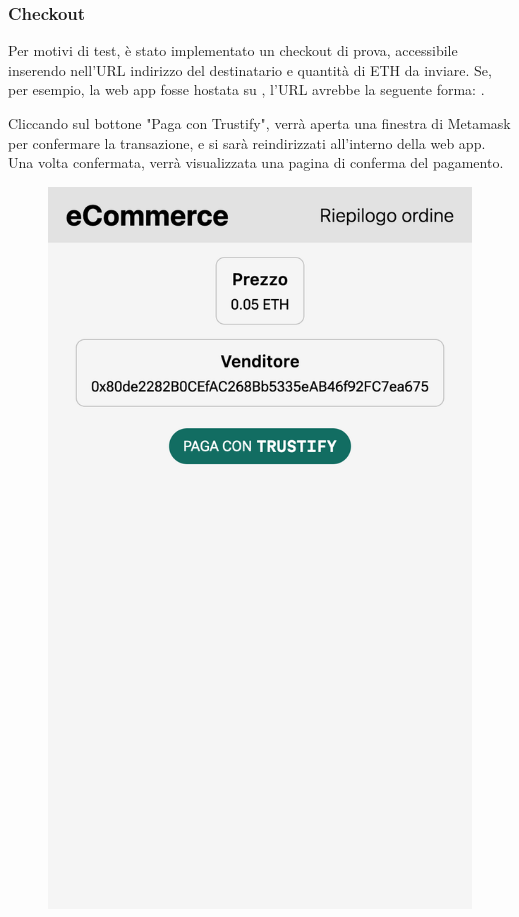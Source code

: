 \subsubsection{Checkout}
Per motivi di test, è stato implementato un checkout di prova, accessibile inserendo nell'URL indirizzo del destinatario e quantità di ETH da inviare. Se, per esempio, la web app fosse hostata su , l'URL avrebbe la seguente forma: .

Cliccando sul bottone "Paga con Trustify", verrà aperta una finestra di Metamask per confermare la transazione, e si sarà reindirizzati all'interno della web app. Una volta confermata, verrà visualizzata una pagina di conferma del pagamento.

\begin{figure}[H]
      \includegraphics[width=\linewidth]{src/img/checkout.png}

\end{figure}
